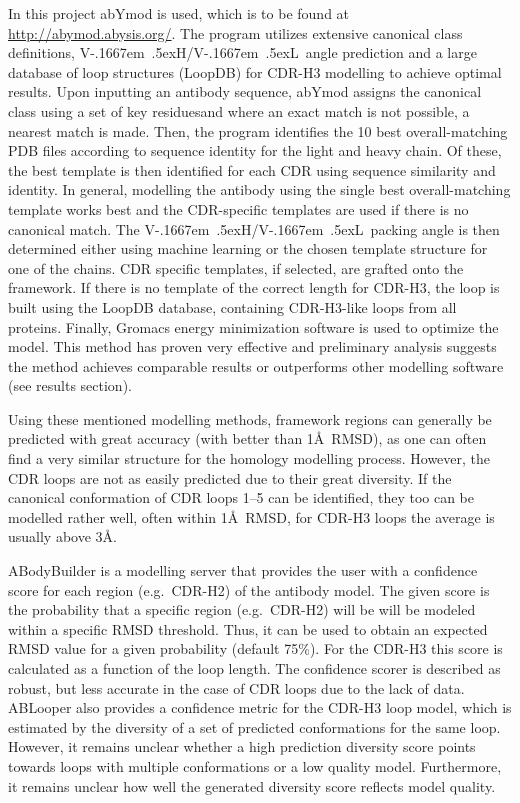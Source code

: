 \documentclass[12pt]{article}
\newcommand{\VH}{\mbox{V\kern-.1667em \lower.5ex\hbox{\scriptsize H}}}
\newcommand{\VL}{\mbox{V\kern-.1667em \lower.5ex\hbox{\scriptsize L}}}
\newcommand{\VHVL}{\mbox{\VH/\VL}}
\begin{document}
In this project abYmod is used, which is to be found at
\url{http://abymod.abysis.org/}. The program utilizes extensive canonical
class definitions, \VHVL\ angle prediction and a large database of loop
structures (LoopDB) for CDR-H3 modelling to achieve optimal
results. Upon inputting an antibody sequence, abYmod assigns the
canonical class using a set of key residues\cite{Martin1996}and where
an exact match is not possible, a nearest match is made. Then, the
program identifies the 10 best overall-matching PDB files according to
sequence identity for the light and heavy chain. Of these, the best
template is then identified for each CDR using sequence similarity and
identity. In general, modelling the antibody using the single best
overall-matching template works best and the CDR-specific templates
are used if there is no canonical match. The \VHVL\ packing angle is
then determined either using machine learning or the chosen template
structure for one of the chains. CDR specific templates, if selected,
are grafted onto the framework. If there is no template of the correct
length for CDR-H3, the loop is built using the LoopDB database,
containing CDR-H3-like loops from all proteins. Finally, Gromacs energy
minimization software is used to optimize the model. This method has
proven very effective and preliminary analysis suggests the method
achieves comparable results or outperforms other modelling software
(see results section).

Using these mentioned modelling methods, framework regions can
generally be predicted with great accuracy (with better than 1\AA\
RMSD\cite{Almagro2014}), as one can often find a very similar
structure for the homology modelling process.  However, the CDR loops
are not as easily predicted due to their great diversity. If the
canonical conformation of CDR loops 1--5 can be identified, they too
can be modelled rather well, often within 1\AA\ RMSD, for CDR-H3 loops
the average is usually above 3\AA\cite{Almagro2011}.

ABodyBuilder is a modelling server that provides the user with a
confidence score for each region (e.g.\ CDR-H2) of the antibody
model. The given score is the probability that a specific region
(e.g.\ CDR-H2) will be will be modeled within a specific RMSD
threshold\cite{Leem2016}. Thus, it can be used to obtain an expected
RMSD value for a given probability (default 75\%). For the CDR-H3 this
score is calculated as a function of the loop length.  The confidence
scorer is described as robust, but less accurate in the case of CDR
loops due to the lack of data\cite{Leem2016}. ABLooper also provides a
confidence metric for the CDR-H3 loop model, which is estimated by the
diversity of a set of predicted conformations for the same
loop\cite{Abanades2022}. However, it remains unclear whether a high
prediction diversity score points towards loops with multiple
conformations or a low quality model. Furthermore, it remains unclear
how well the generated diversity score reflects model
quality\cite{Abanades2022}.
\end{document}
